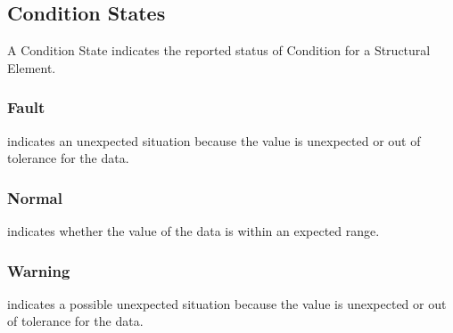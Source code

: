 \subsection{Condition States} \label{sec:Condition States}


A \gls{Condition State} indicates the reported status of \gls{Condition} for a \gls{Structural Element}.


\subsubsection{Fault}
\label{sec:Fault}



 indicates an unexpected situation because the value is unexpected or out of tolerance for the data.


\subsubsection{Normal}
\label{sec:Normal}



 indicates whether the value of the data is within an expected range.


\subsubsection{Warning}
\label{sec:Warning}



 indicates a possible unexpected situation because the value is unexpected or out of tolerance for the data.

